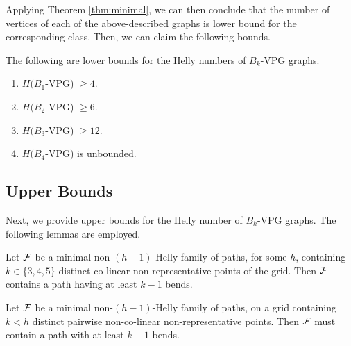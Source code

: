 Applying Theorem \ref{thm:minimal}, we can then conclude that the number of vertices of each of the above-described graphs is lower bound for the corresponding class. Then, we can claim the following bounds.

\begin{claim}\label{claim:VPG-lower}
The following are lower bounds for the Helly numbers of $B_k$-VPG graphs.
\begin{enumerate}
\item $H(B_1$-VPG) $\geq 4$.
\item $H(B_2$-VPG) $\geq 6$.
\item $H(B_3$-VPG) $\geq 12$.
\item $H(B_4$-VPG) is unbounded.
\end{enumerate}
\end{claim}

\subsection{Upper Bounds}

Next, we provide upper bounds for the Helly number of $B_k$-VPG graphs. The following lemmas are employed.

\begin{lemma}\label{column-sizes}
Let $\cal F$ be a minimal non-$(h-1)$-Helly family of paths, for some $h$, containing $k \in \{3,4,5\}$ distinct co-linear non-representative points of the grid. Then $\cal F$ contains a path having at least $k-1$ bends.
\end{lemma}


\begin{lemma}\label{column-number}
Let $\cal F$ be a minimal non-$(h-1)$-Helly family of paths, on a grid containing $k < h$ distinct pairwise non-co-linear non-representative points. Then $\cal F$ must contain a path with at least $k-1$ bends.
\end{lemma}   


